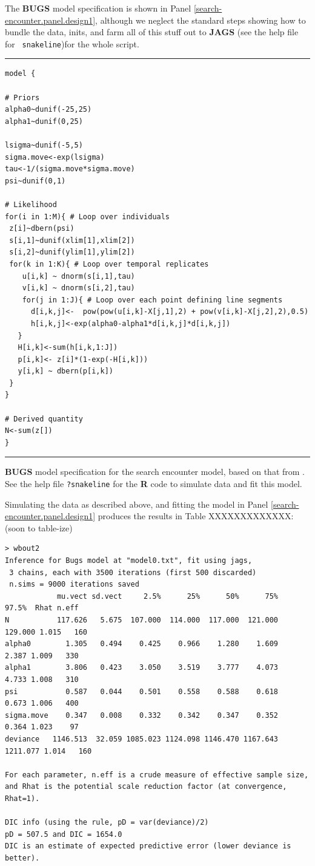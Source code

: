The {\bf BUGS} model specification is shown in Panel 
\ref{search-encounter.panel.design1}, although we neglect the standard
steps showing how to 
bundle the data, inits, and farm
all of this stuff out to {\bf JAGS} (see the help file for \mbox{\tt
  snakeline})for the whole script.

\begin{panel}[htp]
\centering
\rule[0.15in]{\textwidth}{.03in}
{\small
\begin{verbatim}
model {

# Priors
alpha0~dunif(-25,25)
alpha1~dunif(0,25)

lsigma~dunif(-5,5)
sigma.move<-exp(lsigma)
tau<-1/(sigma.move*sigma.move)
psi~dunif(0,1)

# Likelihood
for(i in 1:M){ # Loop over individuals
 z[i]~dbern(psi)
 s[i,1]~dunif(xlim[1],xlim[2])
 s[i,2]~dunif(ylim[1],ylim[2])
 for(k in 1:K){ # Loop over temporal replicates
    u[i,k] ~ dnorm(s[i,1],tau)
    v[i,k] ~ dnorm(s[i,2],tau)
    for(j in 1:J){ # Loop over each point defining line segments
      d[i,k,j]<-  pow(pow(u[i,k]-X[j,1],2) + pow(v[i,k]-X[j,2],2),0.5)
      h[i,k,j]<-exp(alpha0-alpha1*d[i,k,j]*d[i,k,j])
   }
   H[i,k]<-sum(h[i,k,1:J])
   p[i,k]<- z[i]*(1-exp(-H[i,k]))
   y[i,k] ~ dbern(p[i,k])
 }
}

# Derived quantity
N<-sum(z[])
}
\end{verbatim}
}
\rule[-0.15in]{\textwidth}{.03in}
\caption{
{\bf BUGS} model specification for the search encounter model, based
on that from \citet{royle_etal:2011mee}. 
See the 
help file \mbox{\tt ?snakeline} for the {\bf R} code to simulate data
and fit this model. 
}
\label{search-encounter.panel.design1}
\end{panel}


Simulating the data as described above, and fitting the model in Panel
\ref{search-encounter.panel.design1} produces the results in Table
XXXXXXXXXXXXX: (soon to table-ize)

{\small
\begin{verbatim}
> wbout2
Inference for Bugs model at "model0.txt", fit using jags,
 3 chains, each with 3500 iterations (first 500 discarded)
 n.sims = 9000 iterations saved
            mu.vect sd.vect     2.5%      25%      50%      75%    97.5%  Rhat n.eff
N           117.626   5.675  107.000  114.000  117.000  121.000  129.000 1.015   160
alpha0        1.305   0.494    0.425    0.966    1.280    1.609    2.387 1.009   330
alpha1        3.806   0.423    3.050    3.519    3.777    4.073    4.733 1.008   310
psi           0.587   0.044    0.501    0.558    0.588    0.618    0.673 1.006   400
sigma.move    0.347   0.008    0.332    0.342    0.347    0.352    0.364 1.023    97
deviance   1146.513  32.059 1085.023 1124.098 1146.470 1167.643 1211.077 1.014   160

For each parameter, n.eff is a crude measure of effective sample size,
and Rhat is the potential scale reduction factor (at convergence, Rhat=1).

DIC info (using the rule, pD = var(deviance)/2)
pD = 507.5 and DIC = 1654.0
DIC is an estimate of expected predictive error (lower deviance is better).
\end{verbatim}
}


